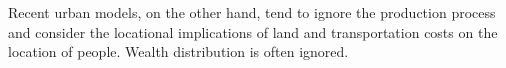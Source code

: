 
Recent urban models, on the other hand, tend to ignore the production process and consider the locational implications of land and transportation costs on the location of people. Wealth distribution is often ignored. 


%

